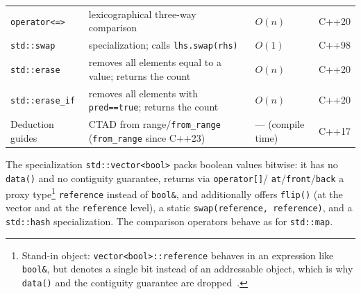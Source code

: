 \begin{longtable}{@{}>{\raggedright\arraybackslash}p{3.1cm} >{\raggedright\arraybackslash}p{5.7cm} >{\raggedright\arraybackslash}p{2.7cm} >{\raggedright\arraybackslash}p{1.1cm}@{}}
  \texttt{operator<=>} & lexicographical three-way comparison & $O(n)$ & C++20 \\
  \texttt{std::swap} & specialization; calls \texttt{lhs.swap(rhs)} & $O(1)$ & C++98 \\
  \texttt{std::erase} & removes all elements equal to a value; returns the count & $O(n)$ & C++20 \\
  \texttt{std::erase\_if} & removes all elements with \texttt{pred==true}; returns the count & $O(n)$ & C++20 \\
  Deduction guides & CTAD from range/\allowbreak\texttt{from\_range} (\texttt{from\_range} since C++23) & --- (compile time) & C++17 \\
  \bottomrule
\end{longtable}

\noindent The specialization \texttt{std::vector<bool>} packs boolean values bitwise: it has no
\texttt{data()} and no contiguity guarantee, returns via \texttt{operator[]}/\allowbreak%
\texttt{at}/\allowbreak\texttt{front}/\allowbreak\texttt{back} a proxy
type\footnote{Stand-in object: \texttt{vector<bool>::reference} behaves in an expression like
\texttt{bool\&}, but denotes a single bit instead of an addressable object, which is why
\texttt{data()} and the contiguity guarantee are dropped~\cite{iso_cpp}.} \texttt{reference}
instead of \texttt{bool\&}, and additionally offers \texttt{flip()} (at the vector and at the
\texttt{reference} level), a static \texttt{swap(reference,\allowbreak\ reference)}, and a
\texttt{std::hash} specialization. The comparison operators behave as for \texttt{std::map}.


